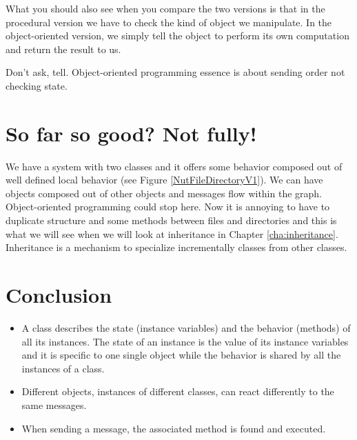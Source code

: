 \documentclass[10pt,twoside,english]{_support/latex/sbabook/sbabook}
\begin{document}
What you should also see when you compare the two versions is that in the procedural version we have to check the kind of object we manipulate. 
In the object-oriented version, we simply tell the object to perform its own computation and return the result to us. 

\begin{important}
Don't ask, tell. Object-oriented programming essence is about sending order not checking state.
\end{important}
\section{So far so good? Not fully!}
We have a system with two classes and it offers some behavior composed out of well defined local behavior (see Figure \ref{NutFileDirectoryV1}). We can have objects composed out of other objects and messages flow within the graph. Object-oriented programming could stop here. Now it is annoying to have to duplicate structure and some methods between files and directories and this is what we will see when we will look at inheritance in Chapter \ref{cha:inheritance}.
Inheritance is a mechanism to specialize incrementally classes from other classes. 
\section{Conclusion}
\begin{itemize}
\item A class describes the state (instance variables) and the behavior (methods) of all its instances. The state of an instance is the value of its instance variables and it is specific to one single object while the behavior is shared by all the instances of a class.
\item Different objects, instances of different classes, can react differently to the same messages.
\item When sending a message, the associated method is found and executed.
\end{itemize}


\backmatter



\end{document}

